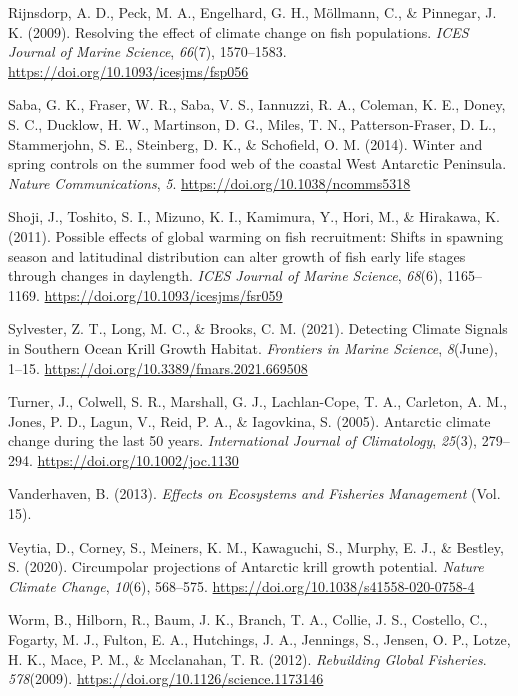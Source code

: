 \documentclass[
]{article}
\newlength{\cslhangindent}
\newenvironment{cslreferences}%
  {\setlength{\parindent}{0pt}%
  \everypar{\setlength{\hangindent}{\cslhangindent}}\ignorespaces}%
  {\par}
\begin{document}
\begin{cslreferences}
\leavevmode\hypertarget{ref-Rijnsdorp2009}{}%
Rijnsdorp, A. D., Peck, M. A., Engelhard, G. H., Möllmann, C., \&
Pinnegar, J. K. (2009). Resolving the effect of climate change on fish
populations. \emph{ICES Journal of Marine Science}, \emph{66}(7),
1570--1583. \url{https://doi.org/10.1093/icesjms/fsp056}

\leavevmode\hypertarget{ref-Saba2014}{}%
Saba, G. K., Fraser, W. R., Saba, V. S., Iannuzzi, R. A., Coleman, K.
E., Doney, S. C., Ducklow, H. W., Martinson, D. G., Miles, T. N.,
Patterson-Fraser, D. L., Stammerjohn, S. E., Steinberg, D. K., \&
Schofield, O. M. (2014). Winter and spring controls on the summer food
web of the coastal West Antarctic Peninsula. \emph{Nature
Communications}, \emph{5}. \url{https://doi.org/10.1038/ncomms5318}

\leavevmode\hypertarget{ref-Shoji2011}{}%
Shoji, J., Toshito, S. I., Mizuno, K. I., Kamimura, Y., Hori, M., \&
Hirakawa, K. (2011). Possible effects of global warming on fish
recruitment: Shifts in spawning season and latitudinal distribution can
alter growth of fish early life stages through changes in daylength.
\emph{ICES Journal of Marine Science}, \emph{68}(6), 1165--1169.
\url{https://doi.org/10.1093/icesjms/fsr059}

\leavevmode\hypertarget{ref-Sylvester2021}{}%
Sylvester, Z. T., Long, M. C., \& Brooks, C. M. (2021). Detecting
Climate Signals in Southern Ocean Krill Growth Habitat. \emph{Frontiers
in Marine Science}, \emph{8}(June), 1--15.
\url{https://doi.org/10.3389/fmars.2021.669508}

\leavevmode\hypertarget{ref-Turner2005}{}%
Turner, J., Colwell, S. R., Marshall, G. J., Lachlan-Cope, T. A.,
Carleton, A. M., Jones, P. D., Lagun, V., Reid, P. A., \& Iagovkina, S.
(2005). Antarctic climate change during the last 50 years.
\emph{International Journal of Climatology}, \emph{25}(3), 279--294.
\url{https://doi.org/10.1002/joc.1130}

\leavevmode\hypertarget{ref-Vanderhaven2013}{}%
Vanderhaven, B. (2013). \emph{Effects on Ecosystems and Fisheries
Management} (Vol. 15).

\leavevmode\hypertarget{ref-Veytia2020}{}%
Veytia, D., Corney, S., Meiners, K. M., Kawaguchi, S., Murphy, E. J., \&
Bestley, S. (2020). Circumpolar projections of Antarctic krill growth
potential. \emph{Nature Climate Change}, \emph{10}(6), 568--575.
\url{https://doi.org/10.1038/s41558-020-0758-4}

\leavevmode\hypertarget{ref-Worm2012}{}%
Worm, B., Hilborn, R., Baum, J. K., Branch, T. A., Collie, J. S.,
Costello, C., Fogarty, M. J., Fulton, E. A., Hutchings, J. A., Jennings,
S., Jensen, O. P., Lotze, H. K., Mace, P. M., \& Mcclanahan, T. R.
(2012). \emph{Rebuilding Global Fisheries}. \emph{578}(2009).
\url{https://doi.org/10.1126/science.1173146}
\end{cslreferences}
\end{document}
